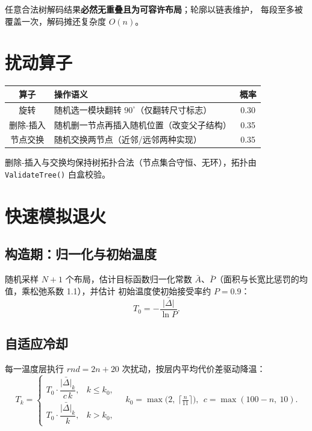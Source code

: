 \documentclass[12pt,a4paper]{article}
\begin{document}
任意合法树解码结果\textbf{必然无重叠且为可容许布局}；轮廓以链表维护，
每段至多被覆盖一次，解码摊还复杂度 $O(n)$。

\section{扰动算子}

\begin{table}[H]
\centering
\small
\begin{tabular}{clc}
\toprule
算子 & 操作语义 & 概率 \\
\midrule
旋转 & 随机选一模块翻转 $90^\circ$（仅翻转尺寸标志） & 0.30 \\
删除-插入 & 随机删一节点再插入随机位置（改变父子结构） & 0.35 \\
节点交换 & 随机交换两节点（近邻/远邻两种实现） & 0.35 \\
\bottomrule
\end{tabular}
\end{table}

删除-插入与交换均保持树拓扑合法（节点集合守恒、无环），拓扑由
\texttt{ValidateTree()} 白盒校验。

\section{快速模拟退火}

\subsection{构造期：归一化与初始温度}

随机采样 $N{+}1$ 个布局，估计目标函数归一化常数
$\bar A$、$\bar P$（面积与长宽比惩罚的均值，乘松弛系数 1.1），并估计
初始温度使初始接受率约 $P=0.9$：
\begin{equation}
T_0 = -\frac{\bar{|\Delta|}}{\ln P}.
\end{equation}

\subsection{自适应冷却}

每一温度层执行 $rnd = 2n + 20$ 次扰动，按层内平均代价差驱动降温：
\begin{equation}
T_k = \begin{cases}
T_0 \cdot \dfrac{\bar{|\Delta|}_k}{c\,k}, & k \le k_0, \\[1.2em]
T_0 \cdot \dfrac{\bar{|\Delta|}_k}{k}, & k > k_0,
\end{cases}
\quad k_0 = \max\!\Big(2,\ \Big\lceil\tfrac{n}{11}\Big\rceil\Big),\ \
c = \max(100-n,\ 10).
\end{equation}
\end{document}
